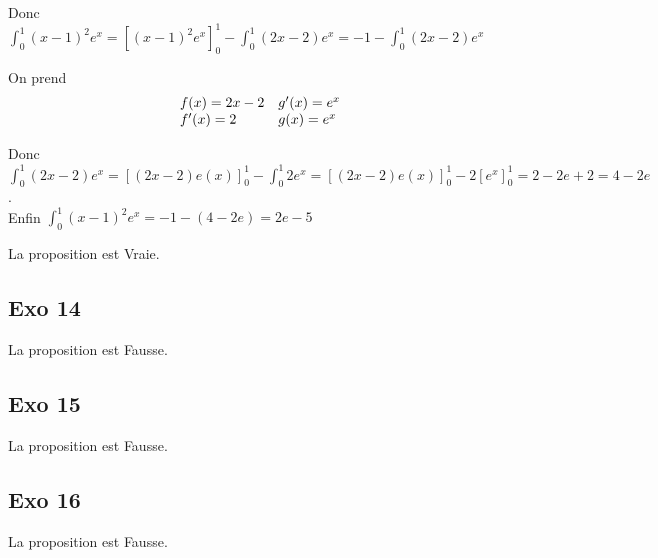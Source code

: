 \documentclass[]{book}
\theoremstyle{definition}
\begin{document}
\medskip
Donc $\int_0^1(x-1)^2e^x = [(x-1)^2e^x]_0^1 - \int_0^1 (2x-2)e^x = -1 - \int_0^1 (2x-2)e^x$

On prend
$$
\begin{array}{l l}
 f(x) = 2x-2 & g'(x) = e^x\\
 f'(x) = 2   & g(x) = e^x\\
\end{array}
$$

\medskip
Donc $\int_0^1 (2x-2)e^x = [(2x-2)e(x)]_0^1 - \int_0^1 2e^x = [(2x-2)e(x)]_0^1 - 2[e^x]_0^1 = 2 - 2e + 2 = 4 - 2e$.\\

Enfin $\int_0^1(x-1)^2e^x = -1 - (4 - 2e) = 2e - 5$


La proposition est Vraie.

\subsection*{Exo 14}

La proposition est Fausse.

\subsection*{Exo 15}

La proposition est Fausse.

\subsection*{Exo 16}

La proposition est Fausse.
\end{document}
